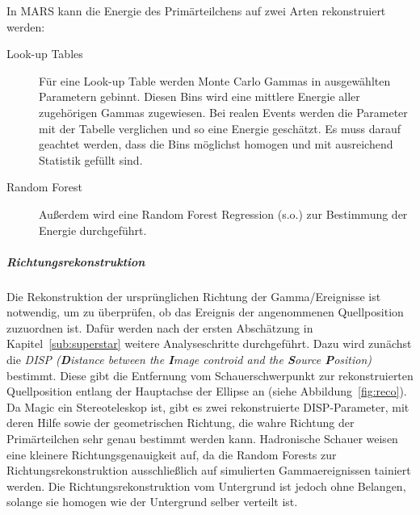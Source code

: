 In MARS kann die Energie des Primärteilchens auf zwei Arten rekonstruiert werden:
\begin{description}
	\item[\quad Look-up Tables] Für eine Look-up Table werden Monte Carlo
		Gammas in ausgewählten Parametern gebinnt.
		Diesen Bins wird eine mittlere Energie aller
		zugehörigen Gammas zugewiesen.
		Bei realen Events werden die Parameter mit der Tabelle verglichen
		und so eine Energie geschätzt.
		Es muss darauf geachtet werden,
		dass die Bins möglichst homogen und mit ausreichend Statistik gefüllt sind.
	\item[\quad Random Forest] Außerdem wird eine Random Forest Regression (s.o.)
		zur Bestimmung der Energie durchgeführt.
\end{description}

\subparagraph{Richtungsrekonstruktion}%
\label{par:position}

Die Rekonstruktion der ursprünglichen Richtung der Gamma\-/Ereignisse
ist notwendig, um zu überprüfen, ob das Ereignis der angenommenen
Quellposition zuzuordnen ist.
Dafür werden nach der ersten Abschätzung in Kapitel~\ref{sub:superstar} weitere
Analyseschritte durchgeführt.
Dazu wird zunächst die \textit{DISP (\textbf{D}istance between the
\textbf{I}mage controid and the \textbf{S}ource \textbf{P}osition)} bestimmt.
Diese gibt die Entfernung vom Schauerschwerpunkt zur rekonstruierten Quellposition
entlang der Hauptachse der Ellipse an (siehe Abbildung~\ref{fig:reco}).
Da Magic ein Stereoteleskop ist, gibt es zwei rekonstruierte DISP-Parameter,
mit deren Hilfe sowie der geometrischen Richtung, 
die wahre Richtung der Primärteilchen sehr genau bestimmt werden kann.
Hadronische Schauer weisen eine kleinere Richtungsgenauigkeit auf, 
da die Random Forests zur Richtungsrekonstruktion ausschließlich auf simulierten Gammaereignissen tainiert werden.
Die Richtungsrekonstruktion vom Untergrund ist jedoch ohne Belangen, solange sie
homogen wie der Untergrund selber verteilt ist.


